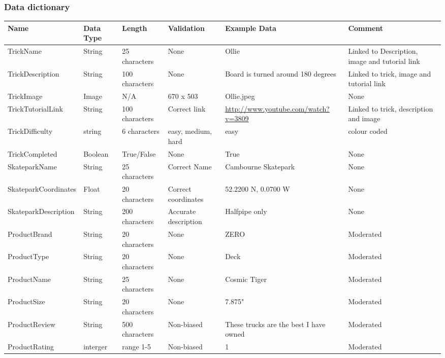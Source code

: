 \begin{landscape}

\subsubsection{Data dictionary}
\begin{center}
\begin{tabular}{|p{3cm}|p{2cm}|p{2.5cm}|p{2cm}|p{3cm}|p{3cm}|}
    \hline
 \textbf{Name} & \textbf{Data Type} & \textbf{Length} & \textbf{Validation} & \textbf{Example Data} & \textbf{Comment} \\ \hline

TrickName & String & 25 characters & None & Ollie & Linked to Description, image and tutorial link \\ \hline
TrickDescription  & String & 100 characters & None & Board is turned around 180 degrees & Linked to trick, image and tutorial link \\ \hline
TrickImage & Image & N/A & 670 x 503 & Ollie.jpeg & None \\ \hline
TrickTutorialLink  & String & 100 characters & Correct link & \url {http://www.youtube.com/watch?v=3809} & Linked to trick, description and image \\ \hline
TrickDifficulty & string & 6 characters & easy, medium, hard & easy & colour coded \\ \hline
TrickCompleted & Boolean & True/False & None & True & None \\ \hline

SkateparkName & String & 25 characters & Correct Name & Cambourne Skatepark & None  \\ \hline
SkateparkCoordinates  & Float & 20 characters & Correct coordinates & 52.2200 N, 0.0700 W & None  \\ \hline
SkateparkDescription & String & 200 characters & Accurate description & Halfpipe only & None \\ \hline

ProductBrand & String & 20 characters & None & ZERO & Moderated \\ \hline
ProductType & String & 20 characters & None & Deck & Moderated \\ \hline
ProductName & String & 25 characters & None & Cosmic Tiger & Moderated \\ \hline
ProductSize & String & 20 characters & None & 7.875" & Moderated \\ \hline
ProductReview  & String & 500 characters & Non-biased & These trucks are the best I have owned & Moderated \\ \hline
ProductRating & interger & range 1-5 & Non-biased & 1 & Moderated \\  \hline


\end{tabular}
\label{tab:Proposed System Data Source and Destinations}
\end{center}
\end{landscape}


